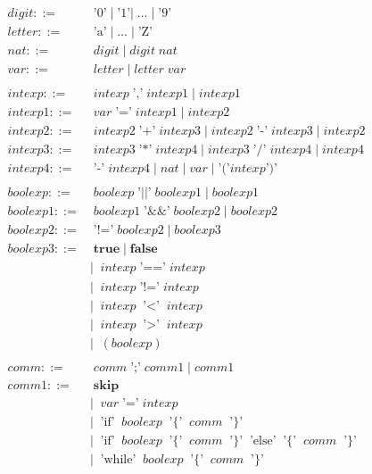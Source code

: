 \documentclass[11pt, fleqn]{article}
\begin{document}
\begin{align*}
digit ::=& \; \text{'0'} \; | \; \text{'1'} | \; \dotsc \; | \; \text{'9'} \\
letter ::=& \; \text{'a'} \; | \; \dotsc \; | \; \text{'Z'} \\
nat ::=& \; digit \; | \; digit \; nat \\
var ::=& \; letter \; | \; letter \; var \\
&\\
intexp ::=& \; intexp \; \text{','} \; intexp1 \; \vert \; intexp1 \\
intexp1 ::=& \; var \; \text{'='} \; intexp1 \; \vert \; intexp2 \\
intexp2 ::=& \; intexp2 \; \text{'+'}  \; intexp3 \; \vert \; intexp2 \; \text{'-'} \; intexp3 \; \vert \; intexp2\\
intexp3 ::=& \; intexp3 \; \text{'*'}  \; intexp4 \; \vert \; intexp3 \; \text{'/'} \; intexp4 \; \vert \; intexp4\\
intexp4 ::=& \; \text{'-'} \; intexp4 \; \vert \; nat \; \vert \; var \; \vert \; \text{'('} intexp \text{')'} \\
& \\
boolexp ::=& \; boolexp \; \text{'$\vert\vert$'} \; boolexp1 \; \vert \; boolexp1 \\
boolexp1 ::=& \; boolexp1 \; \text{'\&\&'} \; boolexp2 \; \vert \; boolexp2 \\
boolexp2 ::=& \; \text{'!='} \; boolexp2 \; \vert \; boolexp3 \\
boolexp3 ::=& \; \textbf{true} \; \vert \; \textbf{false} \\
            &| \;\; intexp \; \text{'=='} \; intexp \\
            &| \;\; intexp \; \text{'!='} \; intexp \\
            &| \;\; intexp \; \text{'$<$'} \; intexp \\
            &| \;\; intexp \; \text{'$>$'} \; intexp \\
            &| \;\; (boolexp) \\
&\\
comm ::=& \; comm \; \text{';'} \; comm1 \; \vert \; comm1 \\
comm1 ::=& \; \textbf{skip} \\
         &| \;\; var \; \text{'='} \; intexp \\
         &| \;\; \text{'if'} \;\;boolexp \;\; \text{'\{'} \;\; comm \;\; \text{'\}'} \\
         &| \;\; \text{'if'} \;\;boolexp \;\; \text{'\{'} \;\; comm \;\; \text{'\}'}  \;\; \text{'else'} \;\; \text{'\{'} \;\; comm \;\; \text{'\}'} \\
         &| \;\; \text{'while'} \;\;boolexp \;\; \text{'\{'} \;\; comm \;\; \text{'\}'} \\
\end{align*}
\end{document}
